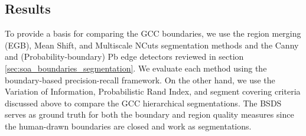 \begin{table}[!ht]
\caption{BSDS image segmentation scores.}
\label{table:segmentation_scores}
\end{table}

\subsection{Results}
To provide a basis for comparing the GCC boundaries, we use the region merging (EGB), Mean Shift, and Multiscale NCuts segmentation methods and the Canny and (Probability-boundary) Pb edge detectors reviewed in section \ref{sec:soa_boundaries_segmentation}. We evaluate each method using the boundary-based precision-recall framework. On the other hand, we use the Variation of Information, Probabilistic Rand Index, and segment covering criteria discussed above to compare the GCC hierarchical segmentations. The BSDS serves as ground truth for both the boundary and region quality measures since the human-drawn boundaries are closed and work as segmentations.

